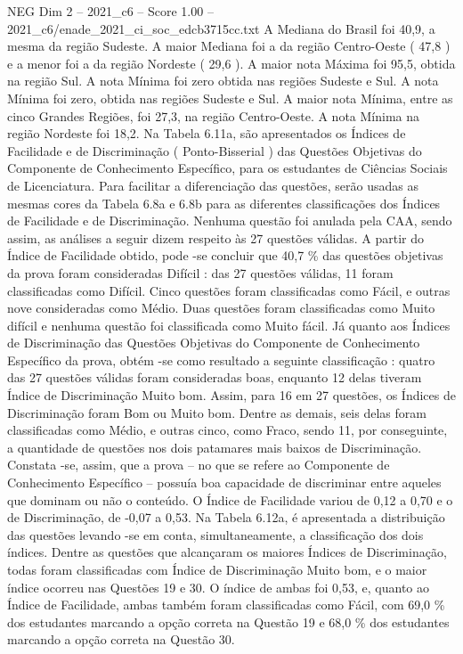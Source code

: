 \begin{textsample}{NEG Dim 2 – 2021\_c6 – Score 1.00 – 2021\_c6/enade\_2021\_ci\_soc\_edcb3715cc.txt}
A Mediana do Brasil foi 40,9, a mesma da região Sudeste.
A maior Mediana foi a da região Centro-Oeste ( 47,8 ) e a menor foi a da região Nordeste ( 29,6 ).
A maior nota Máxima foi 95,5, obtida na região Sul.
A nota Mínima foi zero obtida nas regiões Sudeste e Sul.
A nota Mínima foi zero, obtida nas regiões Sudeste e Sul.
A maior nota Mínima, entre as cinco Grandes Regiões, foi 27,3, na região Centro-Oeste.
A nota Mínima na região Nordeste foi 18,2.
Na Tabela 6.11a, são apresentados os Índices de Facilidade e de Discriminação ( Ponto-Bisserial ) das Questões Objetivas do Componente de Conhecimento Específico, para os estudantes de Ciências Sociais de Licenciatura.
Para facilitar a diferenciação das questões, serão usadas as mesmas cores da Tabela 6.8a e 6.8b para as diferentes classificações dos Índices de Facilidade e de Discriminação.
Nenhuma questão foi anulada pela CAA, sendo assim, as análises a seguir dizem respeito às 27 questões válidas.
A partir do Índice de Facilidade obtido, pode -se concluir que 40,7 \% das questões objetivas da prova foram consideradas Difícil : das 27 questões válidas, 11 foram classificadas como Difícil.
Cinco questões foram classificadas como Fácil, e outras nove consideradas como Médio.
Duas questões foram classificadas como Muito difícil e nenhuma questão foi classificada como Muito fácil.
Já quanto aos Índices de Discriminação das Questões Objetivas do Componente de Conhecimento Específico da prova, obtém -se como resultado a seguinte classificação : quatro das 27 questões válidas foram consideradas boas, enquanto 12 delas tiveram Índice de Discriminação Muito bom.
Assim, para 16 em 27 questões, os Índices de Discriminação foram Bom ou Muito bom.
Dentre as demais, seis delas foram classificadas como Médio, e outras cinco, como Fraco, sendo 11, por conseguinte, a quantidade de questões nos dois patamares mais baixos de Discriminação.
Constata -se, assim, que a prova – no que se refere ao Componente de Conhecimento Específico – possuía boa capacidade de discriminar entre aqueles que dominam ou não o conteúdo.
O Índice de Facilidade variou de 0,12 a 0,70 e o de Discriminação, de -0,07 a 0,53.
Na Tabela 6.12a, é apresentada a distribuição das questões levando -se em conta, simultaneamente, a classificação dos dois índices.
Dentre as questões que alcançaram os maiores Índices de Discriminação, todas foram classificadas com Índice de Discriminação Muito bom, e o maior índice ocorreu nas Questões 19 e 30.
O índice de ambas foi 0,53, e, quanto ao Índice de Facilidade, ambas também foram classificadas como Fácil, com 69,0 \% dos estudantes marcando a opção correta na Questão 19 e 68,0 \% dos estudantes marcando a opção correta na Questão 30.

\end{textsample}
